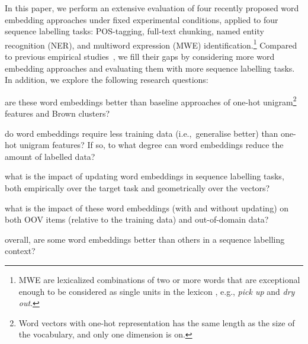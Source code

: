 


In this paper, we perform an extensive evaluation of four recently proposed word embedding
approaches under fixed experimental conditions, applied to four sequence
labelling tasks: POS-tagging, full-text chunking, named entity
recognition (NER), and multiword expression (MWE) identification.\footnote{MWE are lexicalized combinations of two or more
words that are exceptional enough to be considered
as single units in the lexicon \cite{Schneider+:2014}, e.g., \textit{pick up} and \textit{dry out}.}
Compared to previous empirical studies~\cite{collobert2011natural,turian2010word,pennington2014glove}, we fill their gaps by considering more word embedding approaches 
and evaluating them with more sequence labelling tasks. In addition, we explore the following research questions:
\begin{compactenum}[\bf RQ1:]
\item are these word embeddings better than baseline approaches of one-hot
  unigram\footnote{Word vectors with one-hot representation has the same length as the size of the vocabulary, and  only  one  dimension  is  on.} features and Brown clusters?
\item do word embeddings require less training data (i.e.,\ generalise
  better) than one-hot unigram features? If so, to what degree can word embeddings reduce the amount of labelled data?
\item what is the impact of updating word embeddings in sequence
  labelling tasks, both empirically over the target task and
  geometrically over the vectors?
\item what is the impact of these word embeddings (with and without
  updating) on both OOV items (relative to the training data) and
  out-of-domain data?
\item overall, are some word embeddings better than others in a sequence
  labelling context?
\end{compactenum}






